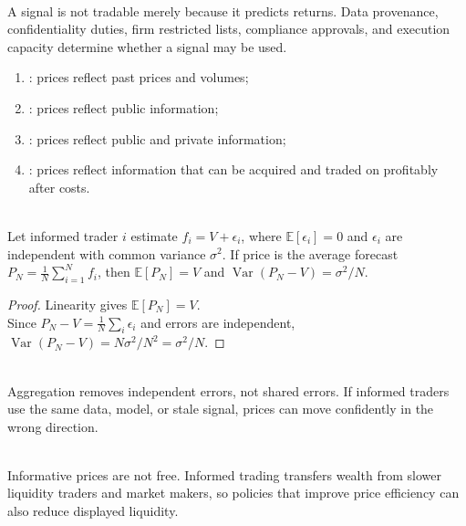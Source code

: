 \documentclass[a4paper,oneside,openany]{book}
\begin{document}
\begin{principle} \\
A signal is not tradable merely because it predicts returns. Data provenance, confidentiality duties, firm restricted lists, compliance approvals, and execution capacity determine whether a signal may be used.
\end{principle}

\begin{taxonomy} 
\begin{enumerate}[label=\roman*.]
\setlength{\itemsep}{0pt}
\item {}: prices reflect past prices and volumes;
\item {}: prices reflect public information;
\item {}: prices reflect public and private information;
\item {}: prices reflect information that can be acquired and traded on profitably after costs.
\end{enumerate}
\end{taxonomy}

\begin{proposition} \\
Let informed trader $i$ estimate $f_i=V+\epsilon_i$, where $\mathbb{E}[\epsilon_i]=0$ and $\epsilon_i$ are independent with common variance $\sigma^2$. If price is the average forecast $P_N=\frac{1}{N}\sum_{i=1}^N f_i$, then $\mathbb{E}[P_N]=V$ and $\operatorname{Var}(P_N-V)=\sigma^2/N$.
\begin{proof}
Linearity gives $\mathbb{E}[P_N]=V$.\\
Since $P_N-V=\frac{1}{N}\sum_i\epsilon_i$ and errors are independent, $\operatorname{Var}(P_N-V)=N\sigma^2/N^2=\sigma^2/N$.
\end{proof}
\end{proposition}

\begin{caveat} \\
Aggregation removes independent errors, not shared errors. If informed traders use the same data, model, or stale signal, prices can move confidently in the wrong direction.
\end{caveat}

\begin{caveat} \\
Informative prices are not free. Informed trading transfers wealth from slower liquidity traders and market makers, so policies that improve price efficiency can also reduce displayed liquidity.
\end{caveat}
\end{document}
